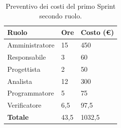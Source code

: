 \begin{table}[ht!]
	\centering
	\begin{tabular}{p{4cm} p{1cm} p{2cm}}
        \toprule
        \textbf{Ruolo} & \textbf{Ore} & \textbf{Costo (€)} \\
        \midrule
        Amministratore & 15 & 450 \\
        Responsabile & 3 & 60 \\
        Progettista & 2 & 50 \\
        Analista & 12 & 300 \\
        Programmatore & 5 & 75 \\
        Verificatore & 6,5 & 97,5 \\
        \bottomrule
        \textbf{Totale} & 43,5 & 1032,5
    \end{tabular}
    \caption{Preventivo dei costi del primo Sprint secondo ruolo.}
	\label{table:Preventivo dei costi del primo Sprint secondo ruolo}
\end{table}
